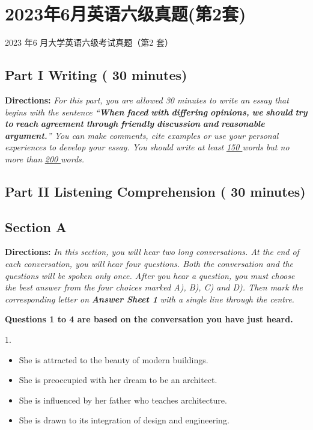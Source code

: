 \documentclass[UTF8,11pt]{ctexart}
\begin{document}
\section*{2023年6月英语六级真题(第2套)}
2023 年6 月大学英语六级考试真题（第2 套）


\subsection*{\textbf{Part I Writing} \textbf{( 30 minutes)}}


\textbf{Directions:}\textit{ For this part, you are allowed 30 minutes to write an essay that begins with the sentence “}\textbf{\textit{When}} \textbf{\textit{faced}} \textbf{\textit{with}} \textbf{\textit{differing}} \textbf{\textit{opinions,}} \textbf{\textit{we}} \textbf{\textit{should}} \textbf{\textit{try}} \textbf{\textit{to}} \textbf{\textit{reach}} \textbf{\textit{agreement}} \textbf{\textit{through}} \textbf{\textit{friendly}} \textbf{\textit{discussion}} \textbf{\textit{and}} \textbf{\textit{reasonable argument.}}\textit{” You can make comments, cite examples or use your personal experiences to develop} \textit{your essay. You should write at least }\textit{\uline{150 }}\textit{words but no more than }\textit{\uline{200 }}\textit{words.}


\subsection*{\textbf{Part II} \textbf{Listening Comprehension} \textbf{( 30 minutes)}}


\subsection*{\textbf{Section A}}


\textbf{Directions:} \textit{In this section, you will hear two long conversations. At the end of each conversation, you will} \textit{hear four questions. Both the conversation and the questions will be spoken only once. After you hear a} \textit{question, you must choose the best answer from the four choices marked A), B), C) and D). Then mark the} \textit{corresponding letter on }\textbf{\textit{Answer Sheet 1}}\textit{ with a single line through the centre.}


\textbf{Questions 1 to 4 are based on the conversation you have just heard.}


1.


\begin{itemize}[leftmargin=2em,itemsep=.2em,topsep=.4em]\item[A.] She is attracted to the beauty of modern buildings.
\item[B.] She is preoccupied with her dream to be an architect.
\item[C.] She is influenced by her father who teaches architecture.
\item[D.] She is drawn to its integration of design and engineering.
\end{itemize}
\end{document}
